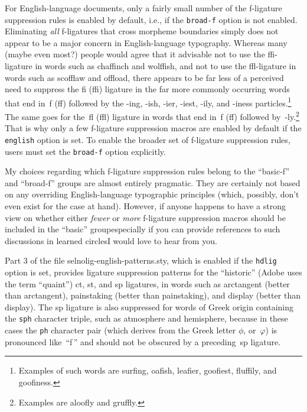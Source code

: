 \documentclass[12pt]{article}
\newcommand{\pkg}[1]{\textsf{#1}}
\newcommand{\opt}[1]{\texttt{#1}}
\begin{document}
For English-language documents, only a fairly small number of the f-ligature suppression rules is enabled by default, i.e., if the \opt{broad-f} option is not enabled. Eliminating \emph{all} f-ligatures that cross morpheme boundaries simply does not appear to be a major concern in English-language typography. Whereas many (maybe even most?) people would agree that it advisable not to use the ffi-ligature in words such as chaffinch and wolffish, and not to use the ffl-ligature in words such as scofflaw and offload, there appears to be far less of a perceived need to suppress the fi (ffi) ligature in the far more commonly occurring words that end in~f (ff) followed by the -ing, -ish, -ier, -iest, -ily, and -iness particles.\footnote{Examples of such words are sur\mbox{fi}ng, oa\mbox{fi}sh, lea\mbox{fi}er, goo\mbox{fi}est, flu\mbox{ffi}ly, and goo\mbox{fi}ness.} The same goes for the~fl (ffl) ligature in words that end in~f (ff) followed by~-ly.\footnote{Examples are \mbox{aloofly} and \mbox{gruffly}.} That is why only a few f-ligature suppression macros are enabled by default if the \opt{english} option is set. To enable the broader set of f-ligature suppression rules, users must set the \opt{broad-f} option explicitly.

My choices regarding which f-ligature suppression rules belong to the \enquote{basic-f} and \enquote{broad-f} groups are almost entirely pragmatic. They are certainly not based on any overriding English-language typographic principles (which, possibly, don't even exist for the case at hand). However, if anyone happens to have a strong view on whether either \emph{fewer} or \emph{more} f-ligature suppression macros should be included in the \enquote{basic} group\textemdash especially if you can provide references to such discussions in learned circles\textemdash I would love to hear from you.


Part 3 of the file \pkg{selnolig-english-patterns.sty}, which is enabled if the \opt{hdlig} option is set, provides ligature suppression patterns for the \enquote{historic} (Adobe uses the term \enquote{quaint}) \mbox{ct}, \mbox{st}, and \mbox{sp} ligatures, in words such as arctangent (better than ar\mbox{ct}angent), painstaking (better than pain\mbox{st}aking), and display (better than di\mbox{sp}lay). The sp ligature is also suppressed for words of Greek origin containing the \opt{sph} character triple, such as atmosphere and hemisphere, because in these cases the \opt{ph} character pair (which derives from the Greek letter $\phi$, or~$\varphi$) is pronounced like~\enquote{f\,} and should not be obscured by a preceding~sp ligature.
\end{document}
